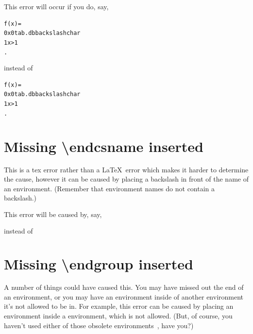 
This error will occur if you do, say,
\begin{alltt}\wrong
f(x) = 
0  x  0\gls{tab.dbbackslashchar}
1  x > 1
.
\end{alltt}
instead of
\begin{alltt}\correct
f(x) = 
0  x  0\gls{tab.dbbackslashchar}
1  x > 1
.
\end{alltt}


\section{Missing \textbackslash endcsname inserted}

This is a \gls{tex} error rather than a \LaTeX\ error
which makes it harder to determine the cause, however it can be
caused by placing a backslash in front of the name of an
\gls{environment}.  (Remember that
\gls{environment} names do not contain a backslash.)

This error will be caused by, say,
\begin{alltt}\wrong
{}
\end{alltt}
instead of
\begin{alltt}\correct
{}
\end{alltt}


\section{Missing \textbackslash endgroup inserted}

A number of things could have caused this.  You may have missed out
the end of an \gls{environment}, or you may have an
environment inside of another environment it's not allowed to be in.
For example, this error can be caused by placing an
 environment inside a 
environment, which is not allowed. (But, of course, you haven't
used either of those obsolete environments~\cite{l2tabu}, have you?) 


